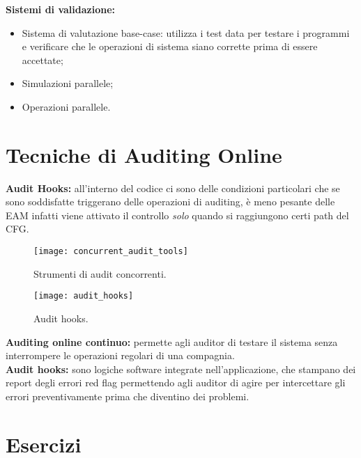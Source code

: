 \textbf{Sistemi di validazione:}

\begin{itemize}
    \item Sistema di valutazione base-case: utilizza i test data per testare i 
    programmi e verificare che 
    le operazioni di sistema siano corrette prima di essere accettate;
    \item Simulazioni parallele;
    \item Operazioni parallele.
\end{itemize}

\section{Tecniche di Auditing Online}

\textbf{Audit Hooks:} all'interno del codice ci sono delle condizioni 
particolari che se sono soddisfatte triggerano delle operazioni di auditing, è 
meno pesante delle EAM infatti viene attivato il controllo \emph{solo} quando 
si raggiungono certi path del CFG.

\begin{figure}[h!]
        \begin{center}
                \texttt{[image: concurrent\_audit\_tools]}
        \end{center}
        \caption{Strumenti di audit concorrenti.}
        \label{fig:concurrent:audit:tools}
\end{figure}

\begin{figure}[h!]
        \begin{center}
                \texttt{[image: audit\_hooks]}
        \end{center}
        \caption{Audit hooks.}
        \label{fig:audit:hooks}
\end{figure}

\textbf{Auditing online continuo:} permette agli auditor di testare il sistema 
senza interrompere le operazioni regolari di una compagnia.\\
\newline
\textbf{Audit hooks:} sono logiche software integrate nell'applicazione, che 
stampano dei report degli errori red flag permettendo agli auditor di agire 
per intercettare gli errori preventivamente prima che diventino dei problemi.

\section{Esercizi}

